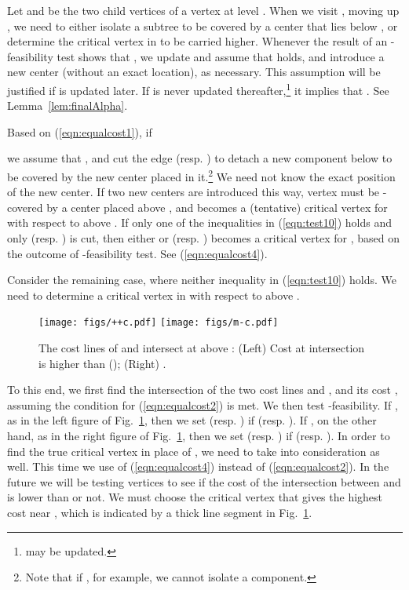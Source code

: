 \documentclass{llncs}
\begin{document}
{Let  and  be the two child vertices of a vertex  at level .
When we visit , moving up ,
we need to either isolate a subtree to be covered by a center
that lies below ,
or determine the critical vertex in  to be carried higher.
Whenever the result of an -feasibility test shows that ,
we update  and assume that  holds,
and introduce a new center (without an exact location),
as necessary.
This assumption will be justified if  is updated later.
If  is never updated thereafter,\footnote{
may be updated.}
it implies that .
See Lemma~\ref{lem:finalAlpha}.

Based on (\ref{eqn:equalcost1}), if 

we assume that , 
and cut the edge  (resp. ) to detach a new component below 
to be covered by the new center placed in it.\footnote{Note that if
, for example,
we cannot isolate a component.}
We need not know the exact position of the new center.
If two new centers are introduced this way,
vertex  must be -covered by a center placed above ,
and  becomes a (tentative) critical vertex for  with respect to  above .
If only one of the inequalities in (\ref{eqn:test10}) holds and only  (resp. ) is cut,
then either  or  (resp. ) becomes a critical vertex for ,
based on the outcome of -feasibility test.
See (\ref{eqn:equalcost4}).

Consider the remaining case,
 where neither inequality in (\ref{eqn:test10}) holds.
We need to determine a critical vertex in  with respect to  above .
\begin{figure}[ht]
\centering
\texttt{[image: figs/++c.pdf]}
\texttt{[image: figs/m-c.pdf]}
\caption{The cost lines of  and  intersect at 
above :
(Left) Cost  at intersection  is higher than  (); 
(Right) .
}
\label{fig:++c}
\end{figure}
To this end,
we first find the intersection  of the two cost lines
 and ,
and its cost ,
assuming the condition for
(\ref{eqn:equalcost2}) is met.
We then test -feasibility.
If , as in the left figure of Fig.~\ref{fig:++c},
then we set  (resp. )
if  (resp. ).
If , on the other hand, as in the right figure of Fig.~\ref{fig:++c},
then we set  (resp. )
if  (resp. ).
In order to find the true critical vertex  in place of ,
we need to take  into consideration as well.
This time we use  of (\ref{eqn:equalcost4}) instead of (\ref{eqn:equalcost2}).
In the future we will be testing vertices  to see if the cost of the intersection 
between  and  
is lower than  or not.
We must choose the critical vertex that gives the highest cost near ,
which is indicated by a thick line segment in Fig.~\ref{fig:++c}.

}
\end{document}
